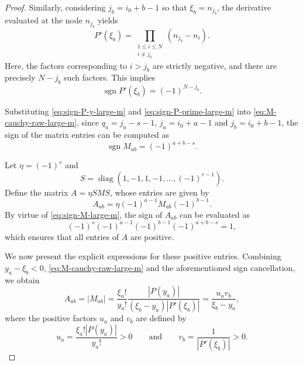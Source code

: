 \documentclass[preprint,3p,10pt]{elsarticle}
\theoremstyle{definition}
\begin{document}
\begin{proof}
Similarly, considering $j_b = i_0 + b - 1$ so that $\xi_b = n_{j_b}$, the derivative evaluated at the node $n_{j_b}$ yields
\begin{equation}
    P'(\xi_b) = \prod_{\substack{1\le i\le N\\ i\neq j_b}}(n_{j_b}-n_i).
\end{equation}
Here, the factors corresponding to $i > j_b$ are strictly negative, and there are precisely $N-j_b$ such factors. This implies
\begin{equation}
    \operatorname{sgn}P'(\xi_b) = (-1)^{N-j_b}. \label{eq:sign-P-prime-large-m}
\end{equation} 

Substituting \eqref{eq:sign-P-y-large-m} and \eqref{eq:sign-P-prime-large-m} into \eqref{eq:M-cauchy-raw-large-m}, since $q_a = j_a - s - 1$, $j_a = i_0 + a - 1$ and $j_b = i_0 + b - 1$, the sign of the matrix entries can be computed as
\begin{equation}
    \operatorname{sgn}M_{ab} = (-1)^{a+b-s}. \label{eq:sign-M-large-m}
\end{equation}

Let $\eta = (-1)^s$ and
$$S = \operatorname{diag}(1, -1, 1, -1, \ldots, (-1)^{r-1}).$$ Define the matrix $A = \eta SMS$, whose entries are given by
\begin{equation}
    A_{ab} = \eta(-1)^{a-1}M_{ab}(-1)^{b-1}.
\end{equation}
By virtue of \eqref{eq:sign-M-large-m}, the sign of $A_{ab}$ can be evaluated as
\begin{equation}
    (-1)^s(-1)^{a-1}(-1)^{b-1}(-1)^{a+b-s}  = 1,
\end{equation}
which ensures that all entries of $A$ are positive.

We now present the explicit expressions for these positive entries.  Combining $y_a - \xi_b < 0$, \eqref{eq:M-cauchy-raw-large-m} and the aforementioned sign cancellation, we obtain
\begin{equation}
    A_{ab} = |M_{ab}| = \frac{\xi_a!}{y_a!} \frac{|P(y_a)|}{(\xi_b-y_a)|P'(\xi_b)|} = \frac{u_a v_b}{\xi_b-y_a}, \label{eq:A-cauchy-type-large-m}
\end{equation}
where the positive factors $u_a$ and $v_b$ are defined by
\begin{equation}
    u_a = \frac{\xi_a!|P(y_a)|}{y_a!} > 0 \qquad \text{and} \qquad v_b = \frac{1}{|P'(\xi_b)|} > 0.
\end{equation}




\end{proof}
\end{document}
